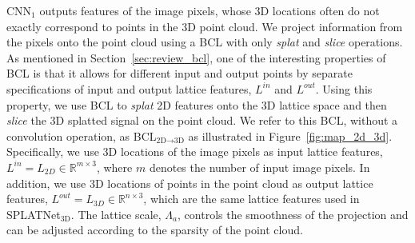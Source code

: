 \documentclass[10pt,twocolumn,letterpaper]{article}
\newcommand{\camreadycomment}[1]{{\textcolor{red}{#1}}}
\begin{document}
CNN$_1$ outputs features of the image pixels, 
whose 3D locations often do not exactly correspond to points in the 3D point cloud. We project 
information from the pixels onto the point cloud using a BCL with only \emph{splat} and \emph{slice} operations. 
As mentioned in Section~\ref{sec:review_bcl}, one of the interesting properties of BCL is that it allows for different
input and output points by separate specifications of input and output lattice features, $L^{in}$ and $L^{out}$.
Using this property, we use BCL to \emph{splat} 2D features onto the 3D lattice space and then \emph{slice} the 3D splatted signal on the point cloud.
We refer to this BCL, without a convolution operation, as BCL$_{\text{2D}\rightarrow\text{3D}}$ 
as illustrated in Figure~\ref{fig:map_2d_3d}. Specifically, we use 3D locations of the image pixels
as input lattice features, $L^{in}=L_{2D} \in \mathbb{R}^{m \times 3}$, where $m$ denotes the number
of input image pixels. In addition, we use 3D locations of points in the point cloud as output lattice
features, $L^{out}=L_{3D} \in \mathbb{R}^{n \times 3}$, which are the same lattice features used in SPLATNet$_{\text{3D}}$.
The lattice scale, $\Lambda_a$, controls the smoothness of the projection and can be adjusted
according to the sparsity of the point cloud.
\end{document}
